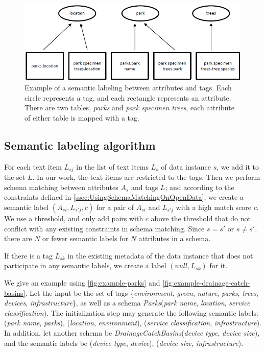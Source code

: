 \begin{figure}
    \centering
    \includegraphics[width=5in]{figures/example-semantic-labeling.png}
    \caption{Example of a semantic labeling between attributes and tags.
    Each circle represents a tag, and each rectangle represents an attribute. There are two tables, \textit{parks} and \textit{park specimen trees}, each attribute of either table is mapped with a tag.}
    \label{fig:example-semantic-labeling}
\end{figure}

\subsection{Semantic labeling algorithm}
\label{ssec:SemanticLabelingAlgorithm}

For each text item $L_{sj}$ in the list of text items $L_{s}$ of data instance $s$, we add it to the set $L$. In our work, the text items are restricted to the tags. Then we perform schema matching between attributes $A_{s}$ and tags $L$; and according to the constraints defined in \autoref{ssec:UsingSchemaMatchingOnOpenData}, we create a semantic label $(A_{si}, L_{s'j}, c)$ for a pair of $A_{si}$ and $L_{s'j}$ with a high match score $c$. We use a threshold, and only add pairs with $c$ above the threshold that do not conflict with any existing constraints in schema matching. Since $s=s'$ or $s\neq s'$, there are $N$ or fewer semantic labels for $N$ attributes in a schema.

If there is a tag $L_{sk}$ in the existing metadata of the data instance that does not participate in any semantic labels, we create a label $(null, L_{sk})$ for it.

We give an example using \autoref{fig:example-parks} and \autoref{fig:example-drainage-catch-basins}. Let the input be the set of tags \{\textit{environment}, \textit{green}, \textit{nature}, \textit{parks}, \textit{trees}, \textit{devices}, \textit{infrastructure}\}, as well as a schema \textit{Parks}(\textit{park name}, \textit{location}, \textit{service classification}). The initialization step may generate the following semantic labels: (\textit{park name}, \textit{parks}), (\textit{location}, \textit{environment}), (\textit{service classification}, \textit{infrastructure}). In addition, let another schema be \textit{DrainageCatchBasins}(\textit{device type}, \textit{device size}), and the semantic labels be (\textit{device type}, \textit{device}), (\textit{device size}, \textit{infrastructure}).


